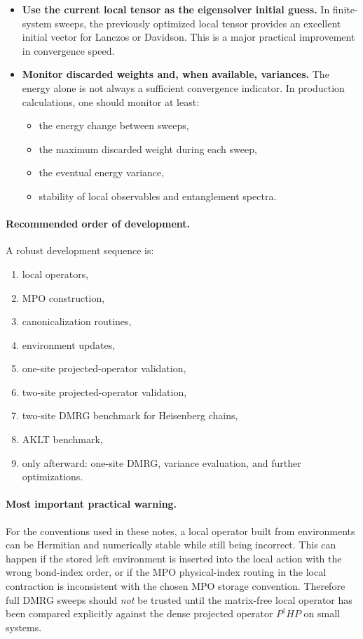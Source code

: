\documentclass[aps,prb,onecolumn,nofootinbib]{revtex4-2}
\begin{document}
\begin{itemize}
		\item \textbf{Use the current local tensor as the eigensolver initial guess.}
		In finite-system sweeps, the previously optimized local tensor provides an excellent initial
		vector for Lanczos or Davidson. This is a major practical improvement in convergence speed.
		
		\item \textbf{Monitor discarded weights and, when available, variances.}
		The energy alone is not always a sufficient convergence indicator. In production calculations,
		one should monitor at least:
		\begin{itemize}
			\item the energy change between sweeps,
			\item the maximum discarded weight during each sweep,
			\item the eventual energy variance,
			\item stability of local observables and entanglement spectra.
		\end{itemize}
	\end{itemize}
	
	\paragraph{Recommended order of development.}
	A robust development sequence is:
	\begin{enumerate}
		\item local operators,
		\item MPO construction,
		\item canonicalization routines,
		\item environment updates,
		\item one-site projected-operator validation,
		\item two-site projected-operator validation,
		\item two-site DMRG benchmark for Heisenberg chains,
		\item AKLT benchmark,
		\item only afterward: one-site DMRG, variance evaluation, and further optimizations.
	\end{enumerate}
	
	\paragraph{Most important practical warning.}
	For the conventions used in these notes, a local operator built from environments can be
	Hermitian and numerically stable while still being incorrect. This can happen if the stored
	left environment is inserted into the local action with the wrong bond-index order, or if
	the MPO physical-index routing in the local contraction is inconsistent with the chosen MPO
	storage convention. Therefore full DMRG sweeps should \emph{not} be trusted until the
	matrix-free local operator has been compared explicitly against the dense projected operator
	\(P^\dagger H P\) on small systems.
	
\end{document}
